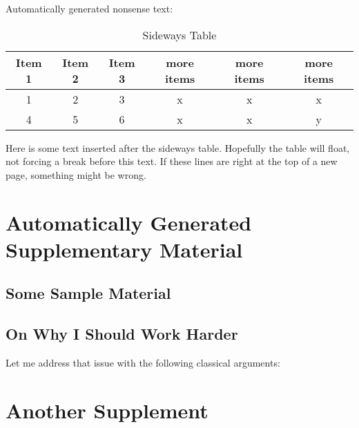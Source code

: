 \documentclass{csuthesis}
\begin{document}
Automatically generated nonsense text: \lipsum[3-4]

\begin{sidewayspage}
\begin{table}[h]
\caption{Sideways Table \label{table:sidetable}}
\begin{tabular}{|c|c|c|ccc|}
\hline
Item 1 & Item 2 & Item 3 & more items & more items & more items\\
\hline
\hline
1 & 2 & 3 & x & x & x\\
4 & 5 & 6 & x & x & y\\
\hline
\end{tabular}
\end{table}
\end{sidewayspage}

Here is some text inserted after the sideways table.  Hopefully the table will float, not forcing a break before this text.  If these lines are right at the top of a new page, something might be wrong. \lipsum[1-3]

\backmatter
% 

\appendix %

\chapter{Automatically Generated Supplementary Material} %

\section{Some Sample Material}

\lipsum[5-7]

\section{On Why I Should Work Harder}

Let me address that issue with the following classical arguments: \lipsum[1-2]

\chapter{Another Supplement}

\lipsum[1-3]
\end{document}
